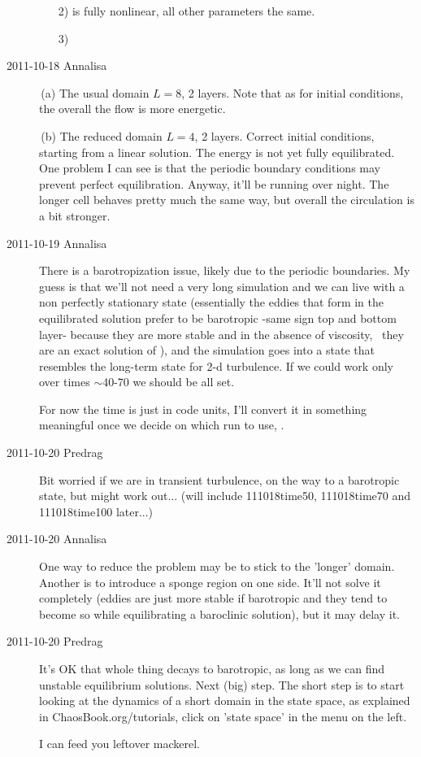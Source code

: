 \begin{description}
\begin{enumerate}
  \item [2)] is fully nonlinear, all other parameters the same.

  \item [3)]
\end{enumerate}

\item[2011-10-18 Annalisa]

\,(a)
The usual domain $L=8$, 2 layers. Note that as
for initial conditions, the overall the flow is more energetic.

\,(b)
The reduced domain $L=4$, 2 layers. Correct initial conditions, starting
from a linear solution. The energy is not yet fully equilibrated. One
problem I can see is that the periodic boundary conditions may prevent
perfect equilibration. Anyway, it'll be running over night. The longer
cell  behaves pretty much the same way, but overall
the circulation is a bit stronger.

\item[2011-10-19 Annalisa]
There is a barotropization issue, likely due to the periodic boundaries.
My guess is that we'll not need a very long simulation and we can live
with a non perfectly stationary state (essentially the eddies that form
in the equilibrated solution prefer to be barotropic -same sign top and
bottom layer- because they are more stable and in the absence of
viscosity, \etc\ they are an exact solution of \NS), and the simulation goes
into a state that resembles the long-term state for 2-d turbulence. If we
could work only over times $\sim $40-70 we should be all set.

For now the time
is just in code units, I'll convert it in something meaningful once we
decide on which run to use, \etc.

\item[2011-10-20 Predrag]
Bit worried if we are in transient turbulence, on the way to a
barotropic state, but might work out... (will include 111018time50,
111018time70 and 111018time100 later...)

\item[2011-10-20 Annalisa]
One way to reduce the problem may be to stick to the 'longer' domain.
Another is to introduce a sponge region on one side. It'll not solve it
completely (eddies are just more stable if barotropic and they tend to
become so while equilibrating a baroclinic solution), but it may delay
it.

\item[2011-10-20 Predrag]
It's OK that whole thing decays to barotropic, as long as we can find
unstable equilibrium solutions. Next (big) step. The short step is
to start looking at the dynamics of a short domain in the state space,
as explained in ChaosBook.org/tutorials, click on 'state space' in the
menu on the left.

I can feed you leftover mackerel.

\end{description}

